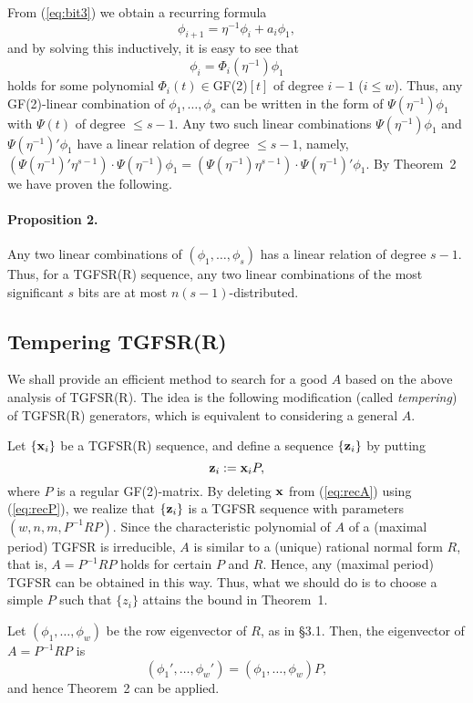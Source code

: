 From (\ref{eq:bit3}) we obtain a recurring formula
$$
 \phi_{i+1}=\eta^{-1}\phi_i+a_i\phi_1,
$$
and by solving this inductively, it is easy to see that
$$\phi_i=\Phi_i(\eta^{-1})\phi_1$$
holds for some polynomial $\Phi_i(t)\in$GF(2)$[t]$ of
degree $i-1$ ($i\leq w$).
Thus, any GF(2)-linear combination of
$\phi_1,\ldots, \phi_s$ can be written
in the form of $\Psi(\eta^{-1})\phi_1$ with $\Psi(t)$ of degree $\leq s-1$. 
Any two such linear combinations 
$\Psi(\eta^{-1})\phi_1$ and 
$\Psi(\eta^{-1})'\phi_1$ 
have a linear relation of degree $\leq s-1$,
namely,
$(\Psi(\eta^{-1})'\eta^{s-1})\cdot\Psi(\eta^{-1})\phi_1
=(\Psi(\eta^{-1})\eta^{s-1})\cdot\Psi(\eta^{-1})'\phi_1$.
By Theorem~2 we have proven
the following.

\paragraph{Proposition 2.}
Any two linear combinations of $(\phi_1,\ldots,\phi_s)$
has a linear relation of degree $s-1$.
Thus, for a TGFSR(R) sequence,
any two linear combinations of the most significant $s$ bits
are at most $n(s-1)$-distributed.

\subsection{Tempering TGFSR(R)}

We shall provide an efficient method to search for a
good $A$ based on the above analysis
of TGFSR(R).
The idea is the following modification 
(called {\em tempering}) of TGFSR(R) generators,
which is equivalent to considering a general $A$.

Let $\{{\bf x}_i\}$ be a TGFSR(R) sequence, and define a sequence
$\{{\bf z}_i\}$ by putting
\begin{equation}
 {\bf z}_i := {\bf x}_i P,
 \label{eq:recP}
\end{equation}
where $P$ is a regular GF(2)-matrix.
By deleting ${\bf x}$ from (\ref{eq:recA}) using (\ref{eq:recP}),
we realize that 
$\{{\bf z}_i\}$ is a TGFSR sequence with parameters
$(w,n,m,P^{-1}RP)$.
Since the characteristic polynomial of $A$ of a (maximal period) TGFSR
is irreducible, $A$ is similar to a (unique) rational normal form $R$,
that is, $A=P^{-1}RP$ holds for certain $P$ and $R$.
Hence, any (maximal period) TGFSR can be obtained in this way.
Thus, what we should do is to choose a simple $P$
such that
$\{z_i\}$ attains the bound in Theorem~1.

Let $(\phi_1,\ldots,\phi_w)$ be the row eigenvector of $R$, as in \S3.1.
Then, the eigenvector of $A=P^{-1}RP$
is
$$
 (\phi_1',\ldots,\phi_w')=(\phi_1,\ldots,\phi_w)P,
$$
and hence Theorem~2 can be applied.


